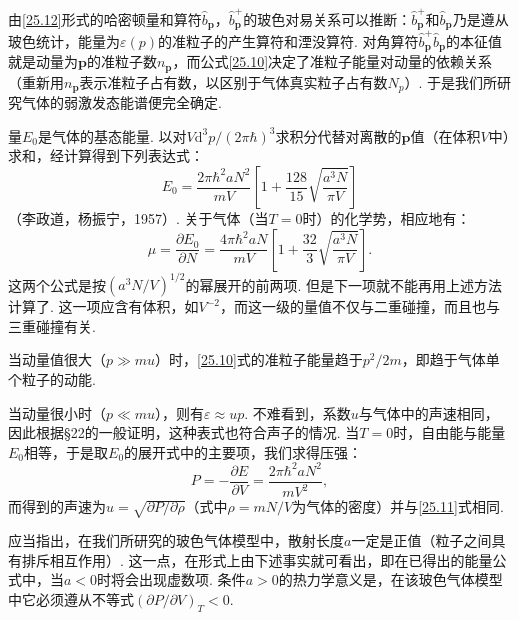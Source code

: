 由\eqref{25.12}形式的哈密顿量和算符$\hat{b}_{\bm{p}}$，$\hat{b}^{+}_{\bm{p}}$的玻色对易关系可以推断：$\hat{b}^{+}_{\bm{p}}$和$\hat{b}_{\bm{p}}$乃是遵从玻色统计，能量为$\varepsilon(p)$的准粒子的产生算符和湮没算符. 对角算符$\hat{b}^{+}_{\bm{p}}\hat{b}_{\bm{p}}$的本征值就是动量为$\bm{p}$的准粒子数$n_{\bm{p}}$，而公式\eqref{25.10}决定了准粒子能量对动量的依赖关系（重新用$n_{\bm{p}}$表示准粒子占有数，以区别于气体真实粒子占有数$N_{p}$）. 于是我们所研究气体的弱激发态能谱便完全确定.

量$E_{0}$是气体的基态能量. 以对$V\mathrm{d}^{3}p/(2\pi\hbar)^{3}$求积分代替对离散的$\bm{p}$值（在体积$V$中）求和，经计算得到下列表达式：
\begin{equation}
E_{0}=\frac{2\pi\hbar^{2}aN^{2}}{mV}\left[1+\frac{128}{15}\sqrt{\frac{a^{3}N}{\pi V}}\right]
\label{25.14}
\end{equation}
（李政道，杨振宁，1957）. 关于气体（当$T=0$时）的化学势，相应地有：
\begin{equation}
\mu=\frac{\partial E_{0}}{\partial N}=\frac{4\pi\hbar^{2}aN}{mV}
\left[1+\frac{32}{3}\sqrt{\frac{a^{3}N}{\pi V}}\right].
\label{25.15}
\end{equation}
这两个公式是按$(a^{3}N/V)^{1/2}$的幂展开的前两项. 但是下一项就不能再用上述方法计算了. 这一项应含有体积，如$V^{-2}$，而这一级的量值不仅与二重碰撞，而且也与三重碰撞有关.

当动量值很大（$p\gg mu$）时，\eqref{25.10}式的准粒子能量趋于$p^{2}/2m$，即趋于气体单个粒子的动能.

当动量很小时（$p\ll mu$），则有$\varepsilon\approx up$. 不难看到，系数$u$与气体中的声速相同，因此根据§22的一般证明，这种表式也符合声子的情况. 当$T=0$时，自由能与能量$E_{0}$相等，于是取$E_{0}$的展开式中的主要项，我们求得压强：
\begin{equation*}
P=-\frac{\partial E}{\partial V}=\frac{2\pi\hbar^{2}aN^{2}}{mV^{2}},
\end{equation*}
而得到的声速为$u=\sqrt{\partial P/\partial\rho}$（式中$\rho=mN/V$为气体的密度）并与\eqref{25.11}式相同.

应当指出，在我们所研究的玻色气体模型中，散射长度$a$一定是正值（粒子之间具有排斥相互作用）. 这一点，在形式上由下述事实就可看出，即在已得出的能量公式中，当$a<0$时将会出现虚数项. 条件$a>0$的热力学意义是，在该玻色气体模型中它必须遵从不等式$(\partial P/\partial V)_{T}<0$.

